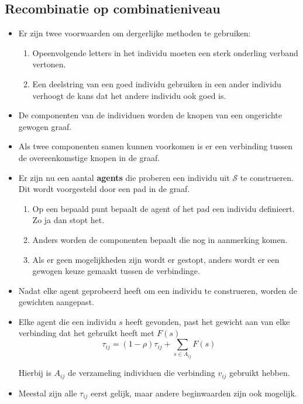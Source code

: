 \subsection{Recombinatie op combinatieniveau}
\begin{itemize}
    \item Er zijn twee voorwaarden om dergerlijke methoden te gebruiken:
    \begin{enumerate}
        \item Opeenvolgende letters in het individu moeten een sterk onderling verband vertonen.
        \item Een deelstring van een goed individu gebruiken in een ander individu verhoogt de kans dat het andere individu ook goed is.
    \end{enumerate}
    \item De componenten van de individuen worden de knopen van een ongerichte gewogen graaf.
    \item Als twee componenten samen kunnen voorkomen is er een verbinding tussen de overeenkomstige knopen in de graaf.
    \item Er zijn nu een aantal \textbf{agents} die proberen een individu uit $\mathcal{S}$ te construeren. Dit wordt voorgesteld door een pad in de graaf.
    \begin{enumerate}
        \item Op een bepaald punt bepaalt de agent of het pad een individu definieert. Zo ja dan stopt het.
        \item Anders worden de componenten bepaalt die nog in aanmerking komen.
        \item Als er geen mogelijkheden zijn wordt er gestopt, anders wordt er een gewogen keuze gemaakt tussen de verbindinge.
    \end{enumerate}
    \item Nadat elke agent geprobeerd heeft om een individu te construeren, worden de gewichten aangepast.
    \item Elke agent die een individu $s$ heeft gevonden, past het gewicht aan van elke verbinding dat het gebruikt heeft met $F(s)$ 
    $$\tau_{ij} = (1 - \rho)\tau_{ij} + \sum_{s \in A_{ij}} F(s)$$
    
    Hierbij is $A_{ij}$ de verzameling individuen die verbinding $v_{ij}$ gebruikt hebben.

    \item Meestal zijn alle $\tau_{ij}$ eerst gelijk, maar andere beginwaarden zijn ook mogelijk.
\end{itemize}